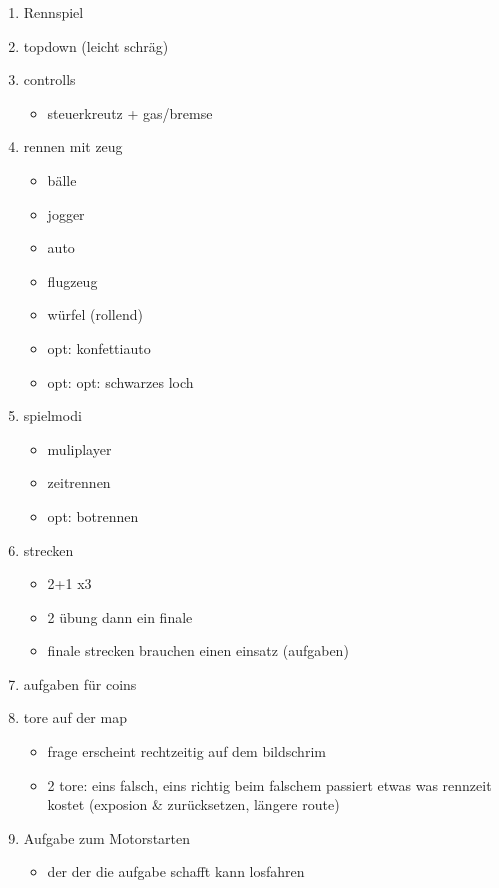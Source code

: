 \begin{enumerate}
	\item{Rennspiel}
	\item{topdown (leicht schräg)}
	\item{controlls}
	\begin{itemize}
    	\item{steuerkreutz + gas/bremse}
    \end{itemize}
	\item{rennen mit zeug}
	\begin{itemize}
    	\item bälle
    	\item jogger
    	\item auto
    	\item flugzeug
    	\item würfel (rollend)
    	\item opt: konfettiauto
    	\item opt: opt: schwarzes loch
    \end{itemize}
	\item spielmodi
	\begin{itemize}
    	\item muliplayer
    	\item zeitrennen
    	\item opt: botrennen
    \end{itemize}
	\item strecken
   	\begin{itemize}
   		\item{2+1 x3}
    	\item{2 übung dann ein finale}
    	\item{finale strecken brauchen einen einsatz (aufgaben)}
    \end{itemize}
	\item{aufgaben für coins}
    \item{tore auf der map}
    \begin{itemize}
        \item{frage erscheint rechtzeitig auf dem bildschrim}
        \item{2 tore: eins falsch, eins richtig}
            beim falschem passiert etwas was rennzeit kostet (exposion \& zurücksetzen, längere route)
    \end{itemize}
    \item{Aufgabe zum Motorstarten}
        \begin{itemize}
        	\item{der der die aufgabe schafft kann losfahren}

\end{itemize}
\end{enumerate}
